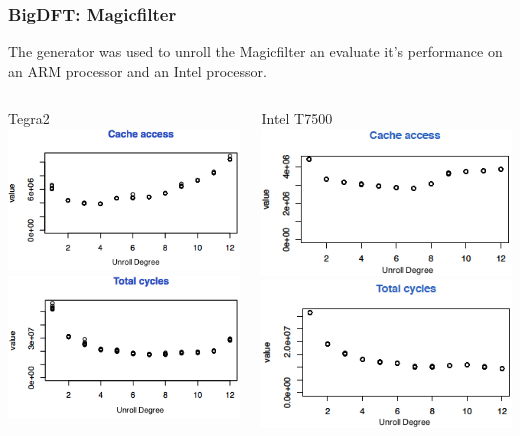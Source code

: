 \documentclass{beamer}
\begin{document}
\begin{frame}
\frametitle{BigDFT: Magicfilter}
The generator was used to unroll the Magicfilter an evaluate it's performance on an ARM processor and an Intel processor.
\centering
\begin{columns}
\column{5cm}
\begin{block}{Tegra2}
\includegraphics[scale=0.4]{cacc}\\
\includegraphics[scale=0.4]{totcyc}
\end{block}
\column{5cm}
\begin{block}{Intel T7500}
\includegraphics[scale=0.4]{nedni_cacc.png}\\
\includegraphics[scale=0.4]{nedni_totcyc.png}
\end{block}
\end{columns}
\end{frame}
\end{document}
